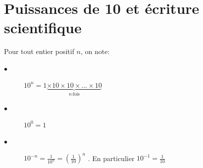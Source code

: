 \documentclass[main.tex]{subfiles}
\begin{document}
% 

\newpage 
{}  
\pagestyle{scrheadings} %
\onehalfspacing  
\section{Puissances de 10 et écriture scientifique}

\begin{definition}
	Pour tout entier positif $n$,  on note:
	\begin{description}
		\item[$\bullet$] $10^n = 1 \underbrace{\times 10 \times 10 \times \ldots \times 10}_{n\, \text{fois}}$ 
		\item[$\bullet$] $10^0= 1$
		\item[$\bullet$] $10^{-n}=\frac{1}{10^n} = \left(\frac{1}{10}\right)^n$ . %
		En particulier $10^{-1}=\frac{1}{10}$
	\end{description} 
\end{definition} 
\end{document}
